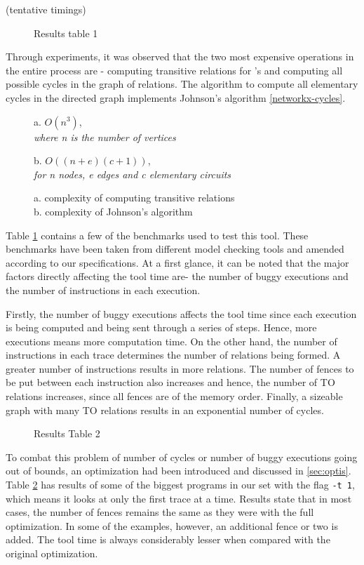 (tentative timings)
\begin{figure}
	
	\caption{Results table 1}\label{fig:tabl1}
\end{figure}

Through experiments, it was observed that the two most expensive operations
in the entire process are - computing transitive relations for \setHB's and
computing all possible cycles in the graph of \setTO relations. The algorithm 
to compute all elementary cycles in the directed graph implements
Johnson's algorithm \ref{networkx-cycles}.

\begin{figure}
	a. $O(n^3)$, \\
	\textit{where n is the number of vertices}
	
	
	b. $O((n+e)(c+1))$, \\
	\textit{for n nodes, e edges and c elementary circuits}
	\caption{a. complexity of computing transitive \setHB relations\\
	b. complexity of Johnson's algorithm}
\end{figure}

Table \ref{fig:tabl1} contains a few of the benchmarks used to test this tool.
These benchmarks have been taken from different model checking tools and amended
according to our specifications. At a first glance, it can be noted that
the major factors directly affecting the tool time are- the number of buggy executions
and the number of instructions in each execution.

Firstly, the number of buggy executions affects the tool time since each execution
is being computed and being sent through a series of steps. Hence, more executions means more
computation time. On the other hand, the number of instructions in each trace 
determines the number of relations being formed. A greater number of instructions
results in more \setHB relations. The number of fences to be put between each instruction also
increases and hence, the number of TO relations increases, since all fences are of the
\mosc memory order. Finally, a sizeable graph with many TO relations
results in an exponential number of cycles. 

\begin{figure}
	
	\caption{Results Table 2}\label{fig:tabl2}
\end{figure}

To combat this problem of number of cycles or number of buggy executions going out of bounds,
an optimization had been introduced and discussed in \ref{sec:optis}. Table \ref{fig:tabl2}
has results of some of the biggest programs in our set with the flag \texttt{-t 1},
which means it looks at only the first trace at a time. Results state that
in most cases, the number of fences remains the same as they were with the 
full optimization. In some of the examples, however, an additional fence or two
is added. The tool time is always considerably lesser when compared with
the original optimization.
